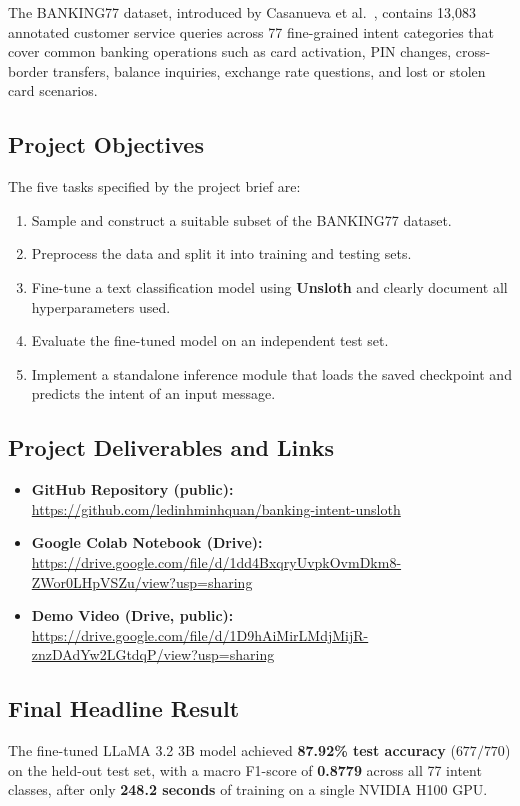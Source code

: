\documentclass[12pt,a4paper]{article}
\newcommand{\repolink}{\url{https://github.com/ledinhminhquan/banking-intent-unsloth}}
\newcommand{\notebooklink}{\url{https://drive.google.com/file/d/1dd4BxqryUvpkOvmDkm8-ZWor0LHpVSZu/view?usp=sharing}}
\newcommand{\videolink}{\url{https://drive.google.com/file/d/1D9hAiMirLMdjMijR-znzDAdYw2LGtdqP/view?usp=sharing}}
\begin{document}
The BANKING77 dataset, introduced by Casanueva et al.~\cite{casanueva2020},
contains 13{,}083 annotated customer service queries across 77 fine-grained
intent categories that cover common banking operations such as card activation,
PIN changes, cross-border transfers, balance inquiries, exchange rate questions,
and lost or stolen card scenarios.

\subsection{Project Objectives}

The five tasks specified by the project brief are:
\begin{enumerate}[noitemsep]
    \item Sample and construct a suitable subset of the BANKING77 dataset.
    \item Preprocess the data and split it into training and testing sets.
    \item Fine-tune a text classification model using \textbf{Unsloth} and
          clearly document all hyperparameters used.
    \item Evaluate the fine-tuned model on an independent test set.
    \item Implement a standalone inference module that loads the saved
          checkpoint and predicts the intent of an input message.
\end{enumerate}

\subsection{Project Deliverables and Links}

\begin{itemize}[noitemsep]
    \item \textbf{GitHub Repository (public):}\\ \repolink{}
    \item \textbf{Google Colab Notebook (Drive):}\\ \notebooklink{}
    \item \textbf{Demo Video (Drive, public):}\\ \videolink{}
\end{itemize}

\subsection{Final Headline Result}

The fine-tuned LLaMA 3.2 3B model achieved \textbf{87.92\% test accuracy}
($677 / 770$) on the held-out test set, with a macro F1-score of
\textbf{0.8779} across all 77 intent classes, after only \textbf{248.2 seconds}
of training on a single NVIDIA H100 GPU.
\end{document}
